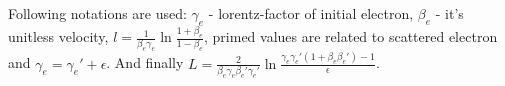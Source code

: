 Following notations are used: $\gamma_e$ - lorentz-factor of initial electron, $\beta_e$ - it's unitless velocity, $l = \frac{1}{\beta_e\gamma_e}\ln\frac{1+\beta_e}{1-\beta_e}$, primed values are related to scattered electron and $\gamma_e = \gamma_e' + \epsilon$. And finally $L = \frac{2}{\beta_e\gamma_e\beta_e'\gamma_e'}\ln\frac{\gamma_e\gamma_e'\left(1+\beta_e\beta_e'\right)-1}{\epsilon}$.
